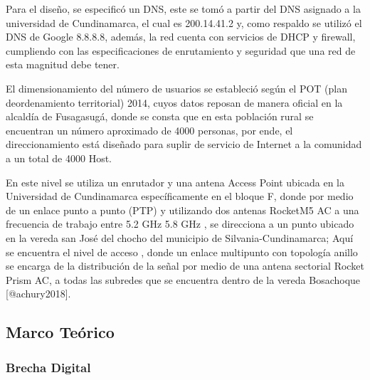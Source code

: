 \documentclass[]{article}
\begin{document}
Para el diseño, se especificó un DNS, este se tomó a partir del DNS
asignado a la universidad de Cundinamarca, el cual es 200.14.41.2 y,
como respaldo se utilizó el DNS de Google 8.8.8.8, además, la red cuenta
con servicios de DHCP y firewall, cumpliendo con las especificaciones de
enrutamiento y seguridad que una red de esta magnitud debe tener.

El dimensionamiento del número de usuarios se estableció según el POT
(plan deordenamiento territorial) 2014, cuyos datos reposan de manera
oficial en la alcaldía de Fusagasugá, donde se consta que en esta
población rural se encuentran un número aproximado de 4000 personas, por
ende, el direccionamiento está diseñado para suplir de servicio de
Internet a la comunidad a un total de 4000 Host.

En este nivel se utiliza un enrutador y una antena Access Point ubicada
en la Universidad de Cundinamarca específicamente en el bloque F, donde
por medio de un enlace punto a punto (PTP) y utilizando dos antenas
RocketM5 AC a una frecuencia de trabajo entre 5.2 GHz 5.8 GHz , se
direcciona a un punto ubicado en la vereda san José del chocho del
municipio de Silvania-Cundinamarca; Aquí se encuentra el nivel de acceso
, donde un enlace multipunto con topología anillo se encarga de la
distribución de la señal por medio de una antena sectorial Rocket Prism
AC, a todas las subredes que se encuentra dentro de la vereda Bosachoque
{[}@achury2018{]}.

\subsection{Marco Teórico}\label{marco-teuxf3rico}

\subsubsection{Brecha Digital}\label{brecha-digital}
\end{document}
